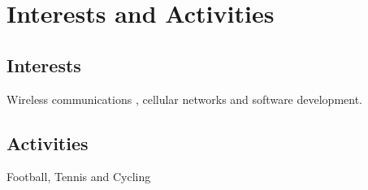 \documentclass[a4paper,10pt]{article}
\begin{document}
\section{Interests and Activities}
\subsection*{Interests}
Wireless communications , cellular networks and software development.\\
\subsection*{Activities}
Football, Tennis and Cycling



\end{document}
